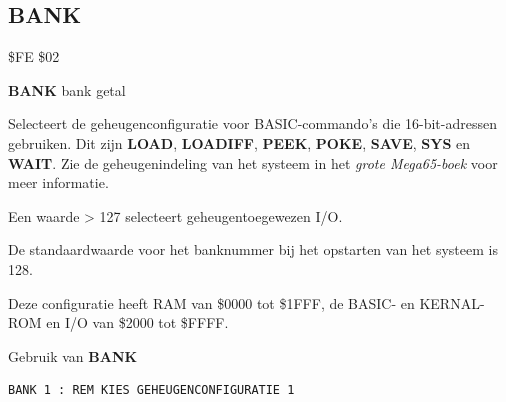 
\newpage
\subsection{BANK}
\label{BASIC 65 Commands!BANK}
\begin{description}[leftmargin=2cm,style=nextline]
\item [Token:]    \$FE \$02

\item [Formaat:]   {\bf BANK} bank getal

\item [Gebruik:]    Selecteert de geheugenconfiguratie voor BASIC-commando's die 16-bit-adressen gebruiken. Dit zijn {\bf LOAD}, {\bf LOADIFF}, {\bf PEEK}, {\bf POKE}, {\bf SAVE}, {\bf SYS} en {\bf WAIT}. Zie de geheugenindeling van het systeem in \ifdefined\printmanual   het {\em grote Mega65-boek}
\else
\fi voor meer informatie.

\item [Opmerkingen:]  Een waarde > 127 selecteert geheugentoegewezen I/O.

                  De standaardwaarde voor het banknummer bij het opstarten van het systeem is 128.

                  Deze configuratie heeft RAM van \$0000 tot \$1FFF, de BASIC- en KERNAL-ROM en I/O van \$2000 tot \$FFFF.

\item [Voorbeeld:]  Gebruik van {\bf BANK}

\begin{tcolorbox}[colback=black,coltext=white]
\verbatimfont{\codefont}
\begin{verbatim}
BANK 1 : REM KIES GEHEUGENCONFIGURATIE 1
\end{verbatim}
\end{tcolorbox}
\end{description}


\newpage
